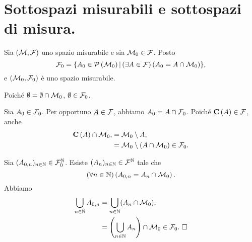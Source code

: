 \section{Sottospazi misurabili e sottospazi di misura.}
\label{Misura_SottospaziMisurabiliESottospaziDiMisura}
\begin{Theorem}
  Sia $(\mathcal{M},\mathcal{F})$ uno spazio misurabile e sia
  $\mathcal{M}_0 \in \mathcal{F}$. Posto
  \[
    \mathcal{F}_0 =
    \lbrace A_0 \in \mathcal{P} \left (\mathcal{M}_0 \right ) |
    \left ( \exists A \in \mathcal{F} \right ) \left ( A_0 = A \cap \mathcal{M}_0 \right ) \rbrace,
  \]
  e
  $(\mathcal{M}_0,\mathcal{F}_0)$ \`e uno spazio misurabile.
\end{Theorem}
\Proof Poich\'e $\emptyset = \emptyset \cap \mathcal{M}_0$,
$\emptyset \in \mathcal{F}_0$.
\par Sia $A_0 \in \mathcal{F}_0$. Per opportuno
$A \in \mathcal{F}$, abbiamo
$A_0 = A \cap \mathcal{F}_0$.
Poich\'e $\mathbf{C} \left ( A \right ) \in \mathcal{F}$, anche
\begin{align*}
        \mathbf{C} \left ( A \right ) \cap \mathcal{M}_0,
        &= \mathcal{M}_0 \setminus A,\\
        &=\mathcal{M}_0 \setminus (A \cap \mathcal{M}_0)
        \in \mathcal{F}_0.
\end{align*}
\par Sia
$(A_{0,n})_{n \in \mathbb{N}}
\in \mathcal{F}_0^\mathbb{N}$.
Esiste
$(A_n)_{n \in \mathbb{N}}
\in \mathcal{F}^\mathbb{N}$ tale che
\[
  \left ( \forall n \in \mathbb{N} \right ) \left ( A_{0,n} = A_n \cap \mathcal{M}_0 \right ).
\]
Abbiamo
\begin{align*}
  \bigcup_{n \in \mathbb{N}} A_{0,n}
  &= \bigcup_{n \in \mathbb{N}} (A_n \cap \mathcal{M}_0),\\
  &= \left ( \bigcup_{n \in \mathbb{N}} A_n \right )
    \cap \mathcal{M}_0
  \in \mathcal{F}_0.\text{ $\square$}
\end{align*}
